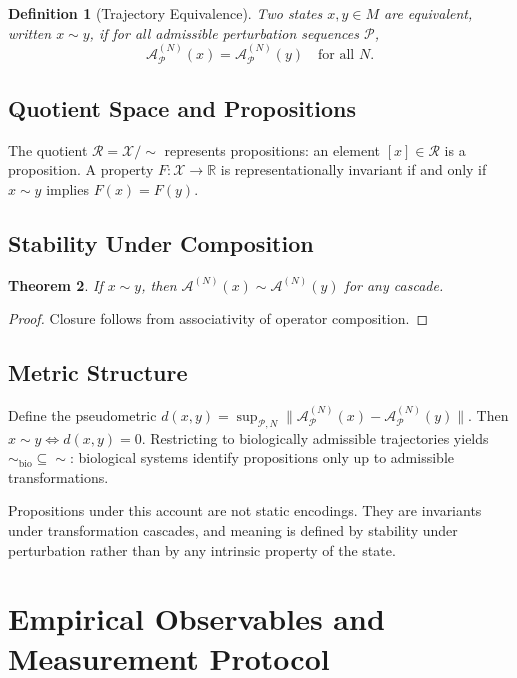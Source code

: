 \documentclass[12pt, a4paper]{article}
\newtheorem{theorem}{Theorem}[section]
\newtheorem{definition}[theorem]{Definition}
\theoremstyle{remark}
\theoremstyle{definition}
\begin{document}
\begin{definition}[Trajectory Equivalence]
Two states $x, y \in M$ are equivalent, written $x \sim y$, if for all admissible
perturbation sequences $\mathcal{P}$,
\[
\mathcal{A}^{(N)}_{\mathcal{P}}(x) = \mathcal{A}^{(N)}_{\mathcal{P}}(y)
\quad \text{for all } N.
\]
\end{definition}

\subsection{Quotient Space and Propositions}

The quotient $\mathcal{R} = \mathcal{X}/{\sim}$ represents propositions: an element
$[x] \in \mathcal{R}$ is a proposition.  A property $F\colon \mathcal{X} \to \mathbb{R}$
is representationally invariant if and only if $x \sim y$ implies $F(x) = F(y)$.

\subsection{Stability Under Composition}

\begin{theorem}
If $x \sim y$, then $\mathcal{A}^{(N)}(x) \sim \mathcal{A}^{(N)}(y)$ for any cascade.
\end{theorem}

\begin{proof}
Closure follows from associativity of operator composition.
\end{proof}

\subsection{Metric Structure}

Define the pseudometric
$d(x,y) = \sup_{\mathcal{P},N}\|\mathcal{A}^{(N)}_{\mathcal{P}}(x) -
\mathcal{A}^{(N)}_{\mathcal{P}}(y)\|$.
Then $x \sim y \iff d(x,y) = 0$.  Restricting to biologically admissible trajectories
yields ${\sim}_{\mathrm{bio}} \subseteq {\sim}$: biological systems identify propositions
only up to admissible transformations.

Propositions under this account are not static encodings.  They are invariants under
transformation cascades, and meaning is defined by stability under perturbation rather than
by any intrinsic property of the state.

\section{Empirical Observables and Measurement Protocol}
\label{app:measurement}
\end{document}
